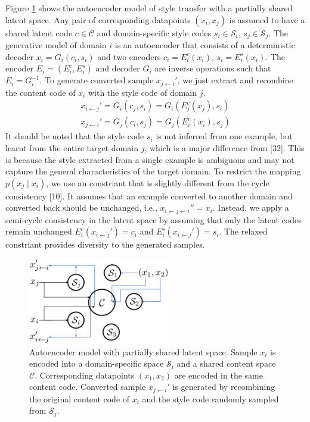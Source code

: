 \documentclass{article}
\begin{document}
Figure \ref{fig:model} shows the autoencoder model of style transfer with a partially shared latent space. Any pair of corresponding datapoints $(x_i, x_j)$ is assumed to have a shared latent code $c\in \mathcal{C}$ and domain-specific style codes $s_i\in \mathcal{S}_i$, $s_j\in \mathcal{S}_j$. The generative model of domain $i$ is an autoencoder that consists of a deterministic decoder $x_i = G_i(c_i,s_i)$ and two encoders $c_i = E_i^c(x_i)$, $s_i = E_i^s(x_i)$. The encoder $E_i = (E_i^c, E_i^s)$ and decoder $G_i$ are inverse operations such that $E_i = G_i^{-1}$. To generate converted sample $x_{j\leftarrow i}'$, we just extract and recombine the content code of $x_i$ with the style code of domain $j$.
\begin{equation}
\begin{aligned}
x_{i\leftarrow j}' = G_i(c_j, s_i) = G_i(E_j^c(x_j), s_i) \\
x_{j\leftarrow i}' = G_j(c_i, s_j) = G_j(E_i^c(x_i), s_j)
\end{aligned}
\end{equation}
It should be noted that the style code $s_i$ is not inferred from one example, but learnt from the entire target domain $j$, which is a major difference from [32]. This is because the style extracted from a single example is ambiguous and may not capture the general characteristics of the target domain. To restrict the mapping $p(x_j\mid x_i)$, we use an constriant that is slightly different from the cycle consistency [10]. It assumes that an example converted to another domain and converted back should be unchanged, i.e., $x_{i\leftarrow j\leftarrow i}'' = x_i$. Instead, we apply a semi-cycle consistency in the latent space by assuming that only the latent codes remain unchanged $E_i^c(x_{i\leftarrow j}') = c_i$ and $E_i^s(x_{i\leftarrow j}') = s_i$. The relaxed constriant provides diversity to the generated samples.

\begin{figure}[htb]
\center
\includegraphics[width=0.55\textwidth]{FIG/model}
\caption{Autoencoder model with partially shared latent space. Sample $x_i$ is encoded into a domain-specific space $\mathcal{S}_i$ and a shared content space $\mathcal{C}$. Corresponding datapoints $(x_1,x_2)$ are encoded in the same content code. Converted sample $x_{j\leftarrow i}'$ is generated by recombining the original content code of $x_i$ and the style code randomly sampled from $\mathcal{S}_j$.}
\label{fig:model}
\end{figure}
\end{document}
